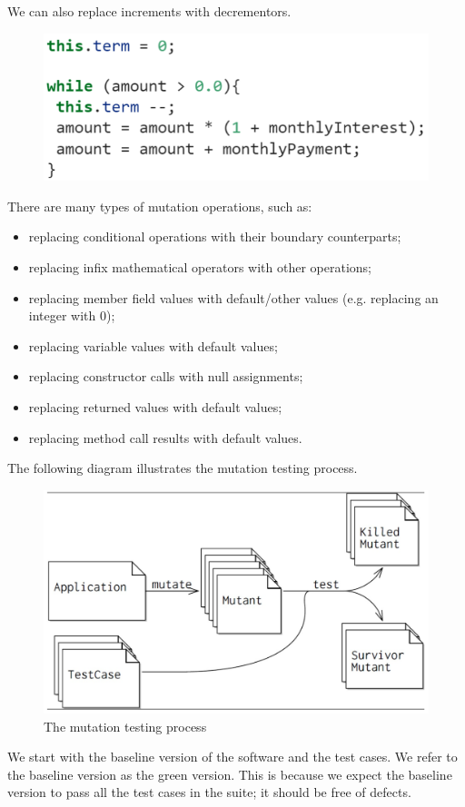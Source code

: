 \documentclass[a4paper, openany]{memoir}
\begin{document}
\noindent We can also replace increments with decrementors.
\begin{figure}[H]
    \centering
    \includegraphics[scale=0.5]{src/12 Mutation 4.PNG}
\end{figure}

There are many types of mutation operations, such as:
\begin{itemize}
    \item replacing conditional operations with their boundary counterparts;
    \item replacing infix mathematical operators with other operations;
    \item replacing member field values with default/other values (e.g. replacing an integer with 0);
    \item replacing variable values with default values;
    \item replacing constructor calls with null assignments;
    \item replacing returned values with default values;
    \item replacing method call results with default values.
\end{itemize}

The following diagram illustrates the mutation testing process.
\begin{figure}[H]
    \centering
    \includegraphics[scale=0.35]{src/12 Mutation testing workflow.PNG}
    \caption{The mutation testing process}
\end{figure}
\noindent We start with the baseline version of the software and the test cases. We refer to the baseline version as the green version. This is because we expect the baseline version to pass all the test cases in the suite; it should be free of defects.
\end{document}
